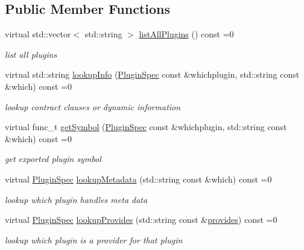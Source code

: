\subsection*{Public Member Functions}
\begin{DoxyCompactItemize}
\item 
virtual std\+::vector$<$ std\+::string $>$ \hyperlink{classkdb_1_1tools_1_1PluginDatabase_adc1f43ccefdd7fc15a57db7571420642}{list\+All\+Plugins} () const =0
\begin{DoxyCompactList}\small\item\em list all plugins \end{DoxyCompactList}\item 
virtual std\+::string \hyperlink{classkdb_1_1tools_1_1PluginDatabase_ac0af2ec31a98f4176c19eaf34977abbe}{lookup\+Info} (\hyperlink{classkdb_1_1tools_1_1PluginSpec}{Plugin\+Spec} const \&whichplugin, std\+::string const \&which) const =0
\begin{DoxyCompactList}\small\item\em lookup contract clauses or dynamic information \end{DoxyCompactList}\item 
virtual func\+\_\+t \hyperlink{classkdb_1_1tools_1_1PluginDatabase_a87b5ef6ee66ce1ad46cc590a2b60b9fa}{get\+Symbol} (\hyperlink{classkdb_1_1tools_1_1PluginSpec}{Plugin\+Spec} const \&whichplugin, std\+::string const \&which) const =0
\begin{DoxyCompactList}\small\item\em get exported plugin symbol \end{DoxyCompactList}\item 
virtual \hyperlink{classkdb_1_1tools_1_1PluginSpec}{Plugin\+Spec} \hyperlink{classkdb_1_1tools_1_1PluginDatabase_a03a416f66d6525f46929e5a68d9db3f7}{lookup\+Metadata} (std\+::string const \&which) const =0
\begin{DoxyCompactList}\small\item\em lookup which plugin handles meta data \end{DoxyCompactList}\item 
virtual \hyperlink{classkdb_1_1tools_1_1PluginSpec}{Plugin\+Spec} \hyperlink{classkdb_1_1tools_1_1PluginDatabase_a43abe56a024218ecee48526ced699f05}{lookup\+Provides} (std\+::string const \&\hyperlink{classkdb_1_1tools_1_1PluginDatabase_afc91ff760616ee83c6afb70e5a2f0601a73ff10d6a07213c277db4326b3df6c4b}{provides}) const =0
\begin{DoxyCompactList}\small\item\em lookup which plugin is a provider for that plugin \end{DoxyCompactList}\end{DoxyCompactItemize}
